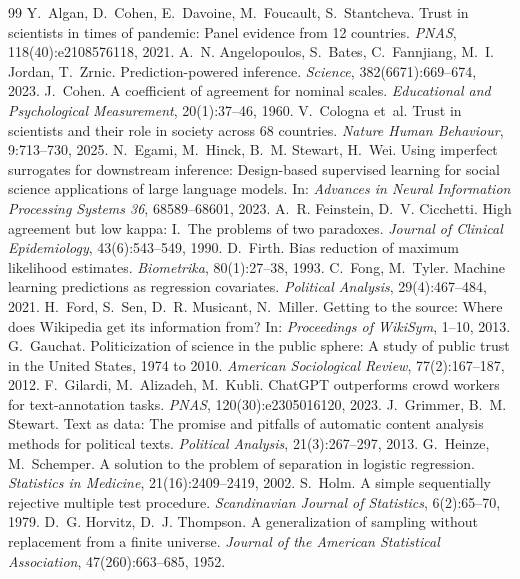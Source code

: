 \documentclass[10pt,a4paper]{article}
\begin{document}
\begin{thebibliography}{99}
 Y.~Algan, D.~Cohen, E.~Davoine, M.~Foucault, S.~Stantcheva. Trust in scientists in times of pandemic: Panel evidence from 12 countries. \textit{PNAS}, 118(40):e2108576118, 2021.
 A.~N. Angelopoulos, S.~Bates, C.~Fannjiang, M.~I. Jordan, T.~Zrnic. Prediction-powered inference. \textit{Science}, 382(6671):669--674, 2023.
 J.~Cohen. A coefficient of agreement for nominal scales. \textit{Educational and Psychological Measurement}, 20(1):37--46, 1960.
 V.~Cologna et~al. Trust in scientists and their role in society across 68 countries. \textit{Nature Human Behaviour}, 9:713--730, 2025.
 N.~Egami, M.~Hinck, B.~M. Stewart, H.~Wei. Using imperfect surrogates for downstream inference: Design-based supervised learning for social science applications of large language models. In: \textit{Advances in Neural Information Processing Systems 36}, 68589--68601, 2023.
 A.~R. Feinstein, D.~V. Cicchetti. High agreement but low kappa: I.~The problems of two paradoxes. \textit{Journal of Clinical Epidemiology}, 43(6):543--549, 1990.
 D.~Firth. Bias reduction of maximum likelihood estimates. \textit{Biometrika}, 80(1):27--38, 1993.
 C.~Fong, M.~Tyler. Machine learning predictions as regression covariates. \textit{Political Analysis}, 29(4):467--484, 2021.
 H.~Ford, S.~Sen, D.~R. Musicant, N.~Miller. Getting to the source: Where does Wikipedia get its information from? In: \textit{Proceedings of WikiSym}, 1--10, 2013.
 G.~Gauchat. Politicization of science in the public sphere: A study of public trust in the United States, 1974 to 2010. \textit{American Sociological Review}, 77(2):167--187, 2012.
 F.~Gilardi, M.~Alizadeh, M.~Kubli. ChatGPT outperforms crowd workers for text-annotation tasks. \textit{PNAS}, 120(30):e2305016120, 2023.
 J.~Grimmer, B.~M. Stewart. Text as data: The promise and pitfalls of automatic content analysis methods for political texts. \textit{Political Analysis}, 21(3):267--297, 2013.
 G.~Heinze, M.~Schemper. A solution to the problem of separation in logistic regression. \textit{Statistics in Medicine}, 21(16):2409--2419, 2002.
 S.~Holm. A simple sequentially rejective multiple test procedure. \textit{Scandinavian Journal of Statistics}, 6(2):65--70, 1979.
 D.~G. Horvitz, D.~J. Thompson. A generalization of sampling without replacement from a finite universe. \textit{Journal of the American Statistical Association}, 47(260):663--685, 1952.

\end{thebibliography}
\end{document}
